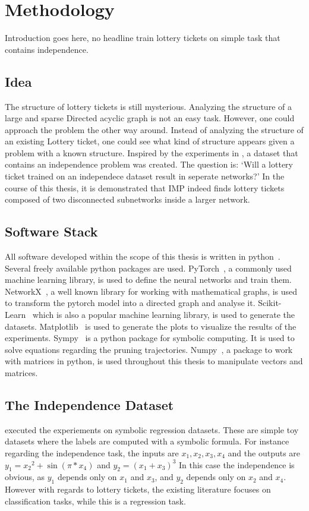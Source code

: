 \chapter{Methodology}
Introduction goes here, no headline
train lottery tickets on simple task that contains independence.

\section{Idea}
The structure of lottery tickets is still mysterious. 
Analyzing the structure of a large and sparse Directed acyclic graph is not an easy task. 
However, one could approach the problem the other way around. 
Instead of analyzing the structure of an existing Lottery ticket, one could see what kind of structure appears given a problem with a known structure.
Inspired by the experiments in \autocite{BIMT}, a dataset that contains an independence problem was created.
The question is:
`Will a lottery ticket trained on an independece dataset result in seperate networks?'
In the course of this thesis, it is demonstrated that IMP indeed finds lottery tickets composed of two disconnected subnetworks inside a larger network.

\section{Software Stack}
All software developed within the scope of this thesis is written in python~\autocite{python}.
Several freely available python packages are used.
PyTorch~\autocite{pytorch}, a commonly used machine learning library, is used to define the neural networks and train them.
NetworkX~\autocite{networkx}, a well known library for working with mathematical graphs, is used to transform the pytorch model into a directed graph and analyse it.
Scikit-Learn~\autocite{sklearn} which is also a popular machine learning library, is used to generate the datasets.
Matplotlib~\autocite{matplotlib} is used to generate the plots to visualize the results of the experiments.
Sympy~\autocite{sympy} is a python package for symbolic computing. It is used to solve equations regarding the pruning trajectories.
Numpy~\autocite{numpy}, a package to work with matrices in python, is used throughout this thesis to manipulate vectors and matrices.

\section{The Independence Dataset}\label{sec:independece_dataset}
\textcite{BIMT} executed the experiements on symbolic regression datasets.
These are simple toy datasets where the labels are computed with a symbolic formula. 
For instance regarding the independence task, the inputs are $x_1, x_2, x_3, x_4$ and the outputs are $y_1={x_2}^2 + \sin{(\pi*x_4)}$ and $y_2={(x_1+x_3)}^3$
In this case the independence is obvious, as $y_1$ depends only on $x_1$ and $x_3$, and $y_2$ depends only on $x_2$ and $x_4$.
However with regards to lottery tickets, the existing literature focuses on classification tasks, while this is a regression task.

